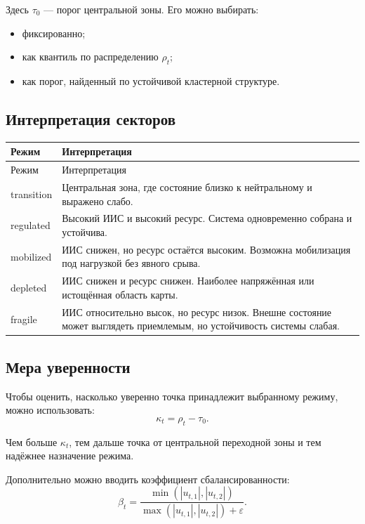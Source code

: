 \documentclass[12pt,a4paper]{article}
\begin{document}
Здесь $\tau_0$ --- порог центральной зоны. Его можно выбирать:
\begin{itemize}[leftmargin=1.25cm]
    \item фиксированно;
    \item как квантиль по распределению $\rho_t$;
    \item как порог, найденный по устойчивой кластерной структуре.
\end{itemize}

\subsection{Интерпретация секторов}
\begin{longtable}{>{\raggedright\arraybackslash}p{3.1cm} >{\raggedright\arraybackslash}p{10.5cm}}
\toprule
Режим & Интерпретация \\
\midrule
\endfirsthead
\toprule
Режим & Интерпретация \\
\midrule
\endhead
transition & Центральная зона, где состояние близко к нейтральному и выражено слабо. \\
regulated & Высокий ИИС и высокий ресурс. Система одновременно собрана и устойчива. \\
mobilized & ИИС снижен, но ресурс остаётся высоким. Возможна мобилизация под нагрузкой без явного срыва. \\
depleted & ИИС снижен и ресурс снижен. Наиболее напряжённая или истощённая область карты. \\
fragile & ИИС относительно высок, но ресурс низок. Внешне состояние может выглядеть приемлемым, но устойчивость системы слабая. \\
\bottomrule
\end{longtable}

\subsection{Мера уверенности}
Чтобы оценить, насколько уверенно точка принадлежит выбранному режиму, можно использовать:
\begin{equation}
\kappa_t = \rho_t - \tau_0.
\end{equation}

Чем больше $\kappa_t$, тем дальше точка от центральной переходной зоны и тем надёжнее назначение режима.

Дополнительно можно вводить коэффициент сбалансированности:
\begin{equation}
\beta_t=
\frac{\min(|u_{t,1}|,|u_{t,2}|)}
{\max(|u_{t,1}|,|u_{t,2}|)+\varepsilon}.
\end{equation}
\end{document}
